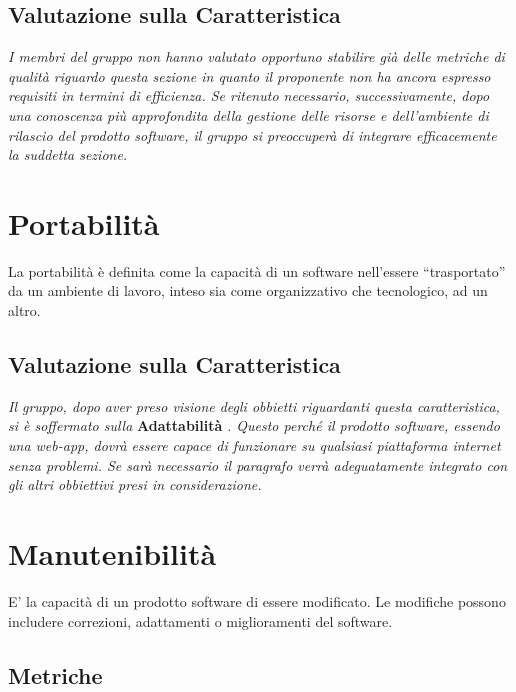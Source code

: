 \subsection{Valutazione sulla Caratteristica} \label{QualitàDelProdottoEfficienzaValutazioneSullaCaratteristica}
\textit{I membri del gruppo non hanno valutato opportuno stabilire già delle metriche di qualità riguardo questa sezione in quanto il proponente non ha ancora espresso requisiti in termini di efficienza. Se ritenuto necessario, successivamente, dopo una conoscenza più approfondita della gestione delle risorse e dell’ambiente di rilascio del prodotto software, il gruppo si preoccuperà di integrare efficacemente la suddetta sezione.}

\section{Portabilità} \label{QualitàDelProdottoPortabilità}
La portabilità è definita come la capacità di un software nell’essere “trasportato” da un ambiente di lavoro, inteso sia come organizzativo che tecnologico,  ad un altro.

\subsection{Valutazione sulla Caratteristica} \label{QualitàDelProdottoPortabilitàValutazioneSullaCaratteristica}
\textit{Il gruppo, dopo aver preso visione degli obbietti riguardanti questa caratteristica, si è soffermato sulla }\textbf{Adattabilità} \textit{.
Questo perché il prodotto software, essendo una web-app, dovrà essere capace di funzionare su qualsiasi piattaforma internet senza problemi.
Se sarà necessario il paragrafo verrà adeguatamente integrato con gli altri obbiettivi presi in considerazione.}

\section{Manutenibilità} \label{QualitàDelProdottoManutenibilità}
E' la capacità di un prodotto software di essere modificato. Le modifiche possono includere correzioni, adattamenti o miglioramenti del software.
\subsection{Metriche}  \label{QualitàDelProdottoManutenibilitàMetriche}

